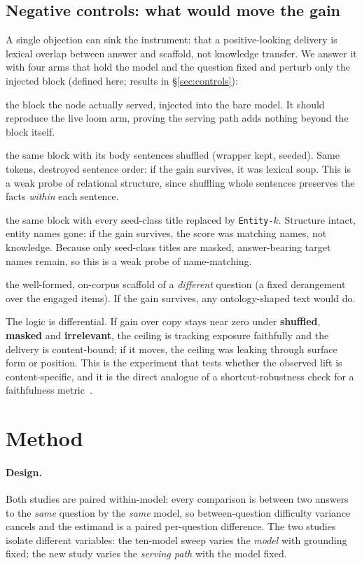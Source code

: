 \documentclass[10pt,twocolumn]{article}
\begin{document}
\subsection{Negative controls: what would move the gain}\label{sec:ceiling-controls}
A single objection can sink the instrument: that a positive-looking delivery is lexical overlap
between answer and scaffold, not knowledge transfer. We answer it with four arms that hold the model
and the question fixed and perturb only the injected block (defined here; results in
\S\ref{sec:controls}):
\begin{description}[topsep=2pt,itemsep=1pt,leftmargin=0pt,font=\normalfont\itshape]
\item[true] the block the node actually served, injected into the bare model. It should reproduce
the live loom arm, proving the serving path adds nothing beyond the block itself.
\item[shuffled] the same block with its body sentences shuffled (wrapper kept, seeded). Same tokens,
destroyed sentence order: if the gain survives, it was lexical soup. This is a weak probe of relational
structure, since shuffling whole sentences preserves the facts \emph{within} each sentence.
\item[masked] the same block with every seed-class title replaced by \texttt{Entity-$k$}. Structure
intact, entity names gone: if the gain survives, the score was matching names, not knowledge. Because
only seed-class titles are masked, answer-bearing target names remain, so this is a weak probe of
name-matching.
\item[irrelevant] the well-formed, on-corpus scaffold of a \emph{different} question (a fixed
derangement over the engaged items). If the gain survives, any ontology-shaped text would do.
\end{description}
The logic is differential. If gain over copy stays near zero under \textbf{shuffled},
\textbf{masked} and \textbf{irrelevant}, the ceiling is tracking exposure faithfully and the
delivery is content-bound; if it moves, the ceiling was leaking through surface form or position.
This is the experiment that tests whether the observed lift is content-specific, and it is the direct
analogue of a shortcut-robustness check for a faithfulness metric~\cite{gao2023alce}.

\section{Method}\label{sec:method}
\paragraph{Design.} Both studies are paired within-model: every comparison is between two answers to
the \emph{same} question by the \emph{same} model, so between-question difficulty variance cancels
and the estimand is a paired per-question difference. The two studies isolate different
variables: the ten-model sweep varies the \emph{model} with grounding fixed; the new study varies
the \emph{serving path} with the model fixed.
\end{document}
